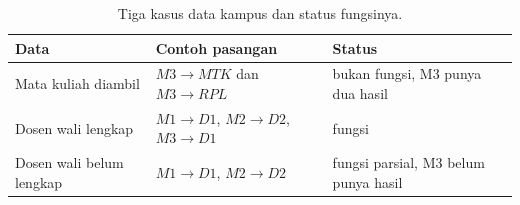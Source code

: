 \documentclass[11pt,a4paper]{article}
\begin{document}
\begin{table}[H]
	\centering
	\caption{Tiga kasus data kampus dan status fungsinya.}
	\label{tab:tiga-kasus}
	\small
	\begin{tabularx}{\textwidth}{l X X}
		\toprule
		Data                     & Contoh pasangan                       & Status                               \\
		\midrule
		Mata kuliah diambil      & $M3 \to MTK$ dan $M3 \to RPL$         & bukan fungsi, M3 punya dua hasil     \\
		Dosen wali lengkap       & $M1 \to D1$, $M2 \to D2$, $M3 \to D1$ & fungsi                               \\
		Dosen wali belum lengkap & $M1 \to D1$, $M2 \to D2$              & fungsi parsial, M3 belum punya hasil \\
		\bottomrule
	\end{tabularx}
\end{table}
\end{document}
